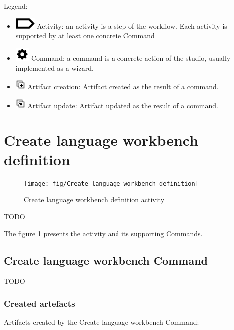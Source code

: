 \documentclass{gemoc} %
\begin{document}
Legend:
\begin{itemize}
	\item \includegraphics[width=1cm]{fig/step} Activity: an activity is a step of the workflow. Each activity is supported by at least one concrete Command
	\item \includegraphics[width=0.7cm]{fig/command} Command: a command is a concrete action of the studio, usually implemented as a wizard.
	\item \includegraphics[width=0.5cm]{fig/artifact_add} Artifact creation: Artifact created as the result of a command.
	\item \includegraphics[width=0.5cm]{fig/artifact_update} Artifact update:  Artifact updated as the result of a command.
\end{itemize}
\section{Create language workbench definition}
\label{sec:Create_language_workbench_definition}
\begin{figure}[h!]
		\center
		\texttt{[image: fig/Create\_language\_workbench\_definition]}
		\caption{Create language workbench definition activity}
		\label{fig:Create_language_workbench_definition}
\end{figure}

TODO

The figure \ref{fig:Create_language_workbench_definition} presents the activity and its supporting Commands.

\subsection{Create language workbench Command}
TODO
\subsubsection{Created artefacts}
Artifacts created by the Create language workbench Command:
\end{document}
